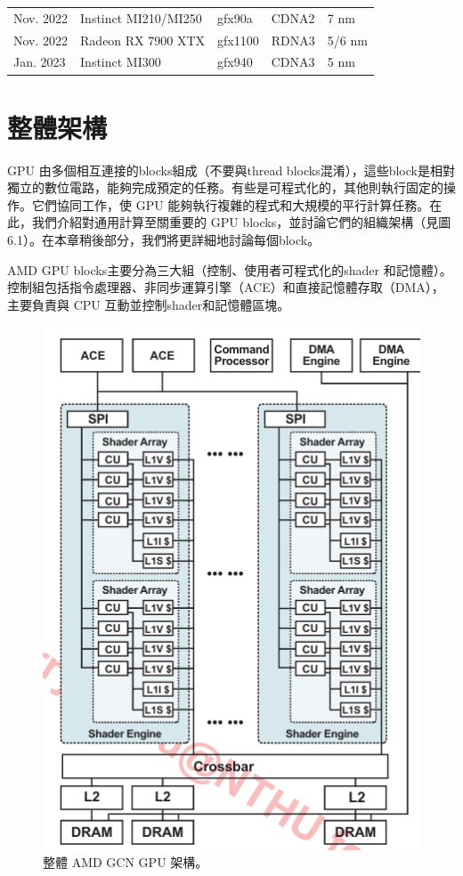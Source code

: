 \begin{table}[htbp]
\begin{tabular}{@{}lllll@{}}
        Nov. 2022            & Instinct MI210/MI250      & gfx90a        & CDNA2                 & 7 nm                     \\
        Nov. 2022            & Radeon RX 7900 XTX        & gfx1100       & RDNA3                 & 5/6 nm                   \\
        Jan. 2023            & Instinct MI300            & gfx940        & CDNA3                 & 5 nm                     \\ \bottomrule
    \end{tabular}
\end{table}

\section{整體架構}
GPU 由多個相互連接的blocks組成（不要與thread blocks混淆），這些block是相對獨立的數位電路，能夠完成預定的任務。有些是可程式化的，其他則執行固定的操作。它們協同工作，使 GPU 能夠執行複雜的程式和大規模的平行計算任務。在此，我們介紹對通用計算至關重要的 GPU blocks，並討論它們的組織架構（見圖6.1）。在本章稍後部分，我們將更詳細地討論每個block。

\vspace{1em}
AMD GPU blocks主要分為三大組（控制、使用者可程式化的shader 和記憶體）。控制組包括指令處理器、非同步運算引擎（ACE）和直接記憶體存取（DMA），主要負責與 CPU 互動並控制shader和記憶體區塊。

\begin{figure}
    \centering
    \includegraphics[width=0.5\linewidth]{FileAusiliari//Screenshots/Figure6-1.png}
    \caption{整體 AMD GCN GPU 架構。}
    \label{fig:enter-label}
\end{figure}

